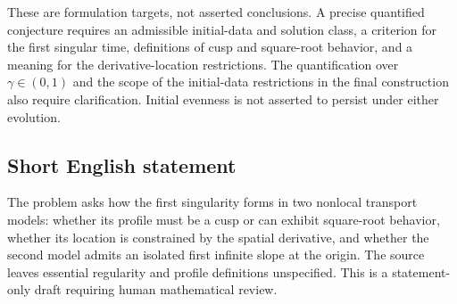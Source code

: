 \documentclass[11pt]{article}
\begin{document}
These are formulation targets, not asserted conclusions. A precise quantified conjecture requires an admissible initial-data and solution class, a criterion for the first singular time, definitions of cusp and square-root behavior, and a meaning for the derivative-location restrictions. The quantification over \(\gamma\in(0,1)\) and the scope of the initial-data restrictions in the final construction also require clarification. Initial evenness is not asserted to persist under either evolution.
\subsection{Short English statement}
The problem asks how the first singularity forms in two nonlocal transport models: whether its profile must be a cusp or can exhibit square-root behavior, whether its location is constrained by the spatial derivative, and whether the second model admits an isolated first infinite slope at the origin. The source leaves essential regularity and profile definitions unspecified. This is a statement-only draft requiring human mathematical review.
\end{document}
